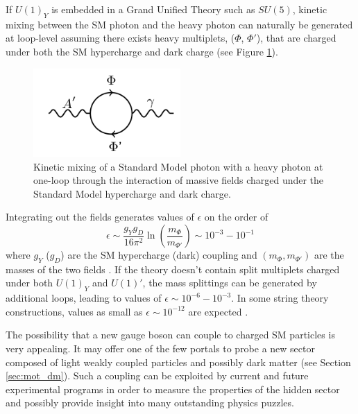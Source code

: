 If $U(1)_Y$ is embedded in a Grand Unified Theory such as $SU(5)$, kinetic mixing between the
SM photon and the heavy photon can naturally be generated at loop-level 
assuming there exists heavy multiplets, ($\Phi$, $\Phi'$), 
that are charged under both the SM hypercharge and dark charge 
(see Figure \ref{fig:ap_loop}).
\begin{figure}
    \centering
    \includegraphics[width=0.5\textwidth]{images/aprime_loop.png}
    \caption{Kinetic mixing of a Standard Model photon with a heavy photon 
    at one-loop through the interaction of massive fields charged under
    the Standard Model hypercharge and dark charge.}
    \label{fig:ap_loop}
\end{figure}
Integrating out the fields generates values of $\epsilon$ on the order of 
\begin{equation}
    \epsilon \sim \frac{g_Yg_D}{16\pi^2}\ln\left(\frac{m_{\Phi}}{m_{\Phi'}} \right)
             \sim 10^{-3} - 10^{-1} 
\end{equation}
where $g_Y$ ($g_D$) are the SM hypercharge (dark) coupling and 
$(m_{\Phi}, m_{\Phi'})$ are the masses of the two fields 
\cite{ArkaniHamed:2008qp, Bjorken:2009mm}.  If the theory doesn't contain 
split multiplets charged under both $U(1)_Y$ and $U(1)'$, the mass splittings 
can be generated by additional loops, leading to values of $\epsilon \sim 10^{-6} - 10^{-3}$. 
In some string theory constructions, 
values as small as $\epsilon \sim 10^{-12}$ are expected 
\cite{Goodsell:2010ie,Goodsell:2009xc, Cicoli:2011yh}.

%
%

The possibility that a new gauge boson can couple to charged SM particles is 
very appealing.  It may offer one of the few portals to probe a new sector 
composed of light weakly coupled particles and possibly dark matter
(see Section \ref{sec:mot_dm}).  Such a coupling can be exploited by current and future
experimental programs in order to measure the properties of
the hidden sector and possibly provide insight into many outstanding physics 
puzzles.

